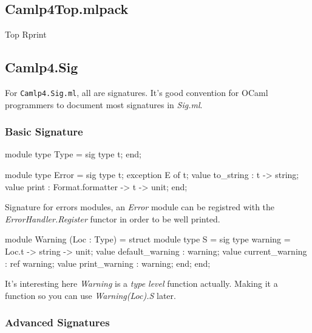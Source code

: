 \subsection{Camlp4Top.mlpack}
\label{Camlp4Top.mlpack}

\begin{bashcode}
  Top
  Rprint
\end{bashcode}

\subsection{Camlp4.Sig}

For \verb|Camlp4.Sig.ml|, all are signatures. It's good convention for
OCaml programmers to document most signatures in \textit{Sig.ml}.


\subsubsection{Basic Signature}

\begin{ocamlcode}
module type Type = sig
  type t;
end;
\end{ocamlcode}

\begin{ocamlcode}
module type Error = sig
  type t;
  exception E of t;
  value to_string : t -> string;
  value print : Format.formatter -> t -> unit;
end;
\end{ocamlcode}

Signature for errors modules, an \textit{Error} module can be
registred with the \textit{ErrorHandler.Register} functor in order to
be well printed.

\begin{ocamlcode}
module Warning (Loc : Type) = struct
  module type S = sig
    type warning = Loc.t -> string -> unit;
    value default_warning : warning;
    value current_warning : ref warning;
    value print_warning   : warning;
  end;
end;
\end{ocamlcode}

It's interesting here \textit{Warning} is a \textit{type level}
function actually. Making it a function so you can use
\textit{Warning(Loc).S} later.

\subsubsection{Advanced Signatures}

